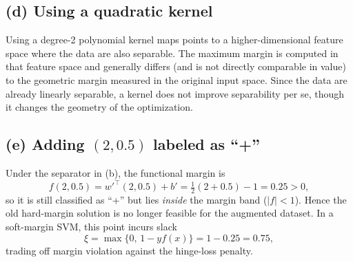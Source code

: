 \documentclass[11pt]{article}
\begin{document}
\subsection*{(d) Using a quadratic kernel}
Using a degree-2 polynomial kernel maps points to a higher-dimensional feature space where the data are also separable. The maximum margin is computed in that feature space and generally differs (and is not directly comparable in value) to the geometric margin measured in the original input space. Since the data are already linearly separable, a kernel does not improve separability per se, though it changes the geometry of the optimization.

\subsection*{(e) Adding $(2,0.5)$ labeled as ``+''}
Under the separator in (b), the functional margin is
\[
f(2,0.5)=w'^\top(2,0.5)+b'=\tfrac12(2+0.5)-1=0.25>0,
\]
so it is still classified as ``+'' but lies \emph{inside} the margin band ($|f|<1$). Hence the old hard-margin solution is no longer feasible for the augmented dataset. In a soft-margin SVM, this point incurs slack
\[
\xi=\max\{0,\,1 - y f(x)\}=1-0.25=0.75,
\]
trading off margin violation against the hinge-loss penalty.
\end{document}
